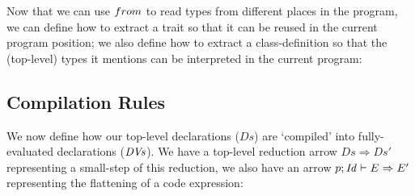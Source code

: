 Now that we can use $\scriptsize\textbf{from}$ to read types from different places in the program, we can define how to extract a trait so that it can be reused in the current program position; we also define how to extract a class-definition so that the (top-level) types it mentions can be interpreted in the current program:

\begin{defs}
\end{defs}

\subsection{Compilation Rules}
We now define how our top-level declarations ($Ds$) are `compiled' into fully-evaluated declarations ($\DVs$). We have a top-level reduction arrow $Ds \Rightarrow Ds'$ representing a small-step of this reduction, we also have an arrow $p; \Id\vdash E\Rightarrow E'$ representing the flattening of a code expression:

